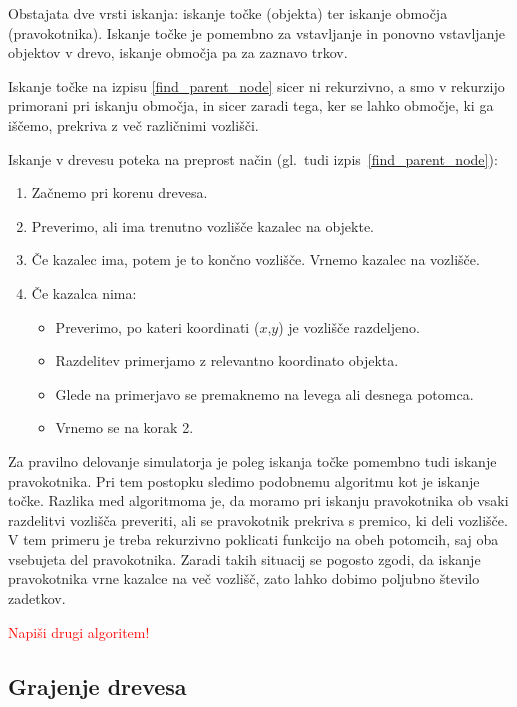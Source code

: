 \documentclass[a4paper,12pt]{article}
\begin{document}
Obstajata dve vrsti iskanja:
iskanje točke (objekta) ter iskanje območja (pravokotnika). Iskanje točke je pomembno za
vstavljanje in ponovno vstavljanje objektov v drevo, iskanje območja pa za zaznavo trkov.


Iskanje točke na izpisu \ref{find_parent_node} sicer ni rekurzivno, a smo v rekurzijo primorani
pri iskanju območja, in sicer zaradi tega, ker se lahko območje, ki ga iščemo, prekriva z več različnimi vozlišči.

\begin{samepage}
Iskanje v drevesu poteka na preprost način (gl.\ tudi izpis~\ref{find_parent_node}):
    \begin{enumerate}
        \item Začnemo pri korenu drevesa.
        \item Preverimo, ali ima trenutno vozlišče kazalec na objekte.
        \item Če kazalec ima, potem je to končno vozlišče. Vrnemo kazalec na vozlišče.
        \item Če kazalca nima:
        \begin{itemize}
            \item Preverimo, po kateri koordinati ($x$,$y$) je vozlišče razdeljeno.
            \item Razdelitev primerjamo z relevantno koordinato objekta.
            \item Glede na primerjavo se premaknemo na levega ali desnega potomca.
            \item Vrnemo se na korak 2.
        \end{itemize}    
    \end{enumerate}
\end{samepage}

Za pravilno delovanje simulatorja je poleg iskanja točke pomembno tudi iskanje pravokotnika. Pri tem postopku
sledimo podobnemu algoritmu kot je iskanje točke. Razlika med algoritmoma je, da moramo pri iskanju pravokotnika
ob vsaki razdelitvi vozlišča preveriti, ali se pravokotnik prekriva s premico, ki deli vozlišče. V tem
primeru je treba rekurzivno poklicati funkcijo na obeh potomcih, saj oba vsebujeta del pravokotnika. Zaradi takih
situacij se pogosto zgodi, da iskanje pravokotnika vrne kazalce na več vozlišč, zato lahko dobimo poljubno število
zadetkov.

\textcolor{red}{Napiši drugi algoritem!}

\subsection{Grajenje drevesa}
\end{document}
